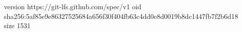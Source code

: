 version https://git-lfs.github.com/spec/v1
oid sha256:5af85e9e86327525684a656f30f404fb63c4dd0e8d0019b8dc1447fb7f2b6d18
size 1531
